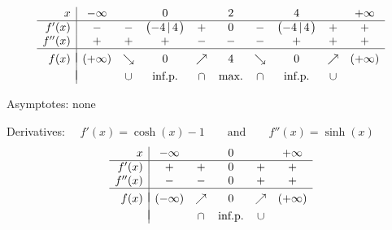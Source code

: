 \begin{Answer}
    		
    			 \[ \begin{array}{r|ccccccccc}
                x & -\infty &  & 0 &  & 2 & & 4 & & +\infty \\
                \hline
                f'(x)   & - & - & \left(-4\left|\,4 \right.\right) & + & 0 & - & \left(-4\left|\,4 \right.\right) & + & +  \\
                f''(x)  & + & + &  + & -  & - & - & + & + & + \\
                \hline
                &&&&&\vspace{-0.3cm}\\
                f(x)    & (+\infty) &  \searrow & 0 & \nearrow & 4 & \searrow & 0 & \nearrow & (+\infty) \\
                &&&&&\vspace{-0.3cm}\\                                                                              
                       & & \cup  & \mbox{inf.p.} & \cap & \mbox{max.} & \cap & \mbox{inf.p.}& \cup &  \\
                \end{array}\]
    		
    	\ifanalysis
    	 \Question Asymptotes: \quad none \par
            Derivatives: $\quad f'(x)=\cosh (x) - 1\qquad\mbox{and}\qquad f''(x)=\sinh (x)$
                \[ \begin{array}{r|ccccc}
                x & -\infty & & 0 & &+\infty \\
                \hline
                f'(x)   & + & + & 0 & + & +\\
                f''(x)  & - & - & 0 & + & +\\
                \hline
                &&&&&\vspace{-0.3cm}\\
                f(x)    & (-\infty) & \nearrow & 0 & \nearrow & (+\infty)\\
                &&&&&\vspace{-0.3cm}\\                                                                              
                        & & \cap & \mbox{inf.p.} & \cup \\
                \end{array}\]
    

\end{Answer}
